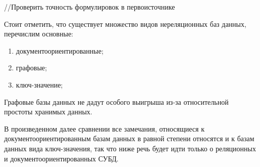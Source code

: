 //Проверить точность формулировок в первоисточнике

Стоит отметить, что существует множество видов нереляционных баз данных, перечислим
основные:

\begin{enumerate}
    \item документоориентированные;
    \item графовые;
    \item ключ-значение;
\end{enumerate}

Графовые базы данных не дадут особого выигрыша из-за относительной простоты хранимых данных.

В произведенном далее сравнении все замечания, относящиеся к документоориентированным базам данных
в равной степени относятся и к базам данных вида ключ-значения, так что ниже речь будет идти
только о реляционных и документоориентированных СУБД.
